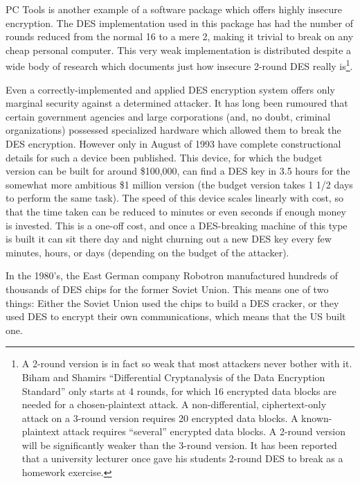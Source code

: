 PC Tools is another example of a software package which offers highly insecure
encryption.  The DES implementation used in this package has had the number of
rounds reduced from the normal 16 to a mere 2, making it trivial to break on
any cheap personal computer.  This very weak implementation is distributed
despite a wide body of research which documents just how insecure 2-round DES
really is\footnote{
		A 2-round version is in fact so weak that most attackers never
              	bother with it.  Biham and Shamirs ``Differential Cryptanalysis of
              	the Data Encryption Standard'' only starts at 4 rounds, for which
              	16 encrypted data blocks are needed for a chosen-plaintext
              	attack.  A non-differential, ciphertext-only attack on a 3-round
              	version requires 20 encrypted data blocks.  A known-plaintext
              	attack requires ``several'' encrypted data blocks.  A 2-round
              	version will be significantly weaker than the 3-round version.
              	It has been reported that a university lecturer once gave his
              	students 2-round DES to break as a homework exercise.
}.

Even a correctly-implemented and applied DES encryption system offers only
margi\-nal security against a determined attacker.  It has long been rumoured
that certain government agencies and large corporations (and, no doubt,
criminal organizations) possessed specialized hardware which allowed them to
break the DES encryption.  However only in August of 1993 have complete
constructional details for such a device been published.  This device, for
which the budget version can be built for around \$100,000, can find a DES key
in 3.5 hours for the somewhat more ambitious \$1 million version (the budget
version takes 1 1/2 days to perform the same task). The speed of this device
scales linearly with cost, so that the time taken can be reduced to minutes or
even seconds if enough money is invested.  This is a one-off cost, and once a
DES-breaking machine of this type is built it can sit there day and night
churning out a new DES key every few minutes, hours, or days (depending on the
budget of the attacker).

In the 1980's, the East German company Robotron manufactured hundreds of
thousands of DES chips for the former Soviet Union.  This means one of two
things: Either the Soviet Union used the chips to build a DES cracker, or they
used DES to encrypt their own communications, which means that the US built
one.

